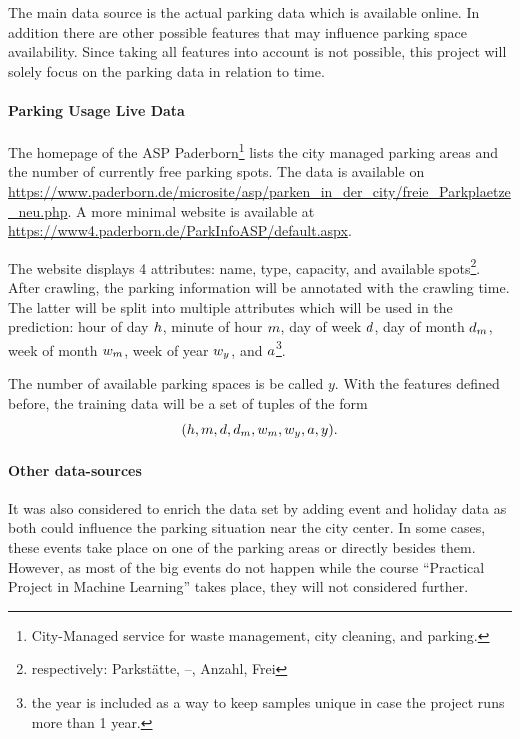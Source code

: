The main data source is the actual parking data which is available online. In addition there are other possible features that may influence parking space availability. Since taking all features into account is not possible, this project will solely focus on the parking data in relation to time. 

\paragraph{Parking Usage Live Data}
The homepage of the ASP Paderborn\footnote{City-Managed service for waste management, city cleaning, and parking.} lists the city managed parking areas and the number of currently free parking spots. 
The data is available on \url{https://www.paderborn.de/microsite/asp/parken_in_der_city/freie_Parkplaetze_neu.php}. A more minimal website is available at \url{https://www4.paderborn.de/ParkInfoASP/default.aspx}. 

The website displays 4 attributes: name, type, capacity, and available spots\footnote{respectively: Parkstätte, --, Anzahl, Frei}. After crawling, the parking information will be annotated with the crawling time. The latter will be split into multiple attributes which will be used in the prediction: hour of day \(h\), minute of hour \(m\), day of week \(d\), day of month \(d_m\), week of month \(w_m\), week of year \(w_y\), and \(a\)\footnote{the year is included as a way to keep samples unique in case the project runs more than 1 year.}.

The number of available parking spaces is be called \(y\). With the features defined before, the training data will be a set of tuples of the form  
\[
(h, m, d, d_m, w_m, w_y, a, y)\text{.}
\]

\paragraph{Other data-sources}
It was also considered to enrich the data set by adding event and holiday data as both could influence the parking situation near the city center. In some cases, these events take place on one of the parking areas or directly besides them. However, as most of the big events do not happen while the course ``Practical Project in Machine Learning'' takes place, they will not considered further.

